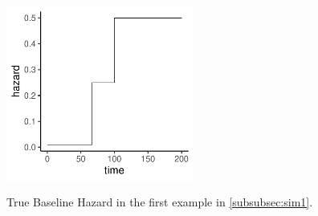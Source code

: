 \documentclass[ba]{imsart}
\begin{document}
\begin{table}
\begin{center}
\end{center}
\caption{Comparison metrics in terms of MSE and posterior coverage rate from 300 independent replications, for the 100 frailty effects in the first simulation study in section \ref{subsubsec:sim1}.}
\label{table:Sim1AggRandom}
\end{table}



\begin{figure}[ht]
\centering
\includegraphics[width=0.55\textwidth,height=2.5in]{base_sim1.pdf}
\caption{True Baseline Hazard in the first example in \ref{subsubsec:sim1}.}
\label{fig:truebase1}
\end{figure}
\end{document}
